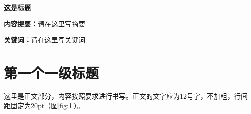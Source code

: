 \documentclass{mystyle} %
\begin{document}
\maketitlepage

\begin{center}
\textbf{\fontsize{18}{22}\selectfont 这是标题}
\end{center}

\begin{flushleft}
\fontsize{10.5}{12}\selectfont \textbf{内容提要：}请在这里写摘要
\end{flushleft}

\begin{flushleft}
\fontsize{10.5}{12}\selectfont \textbf{关键词：}请在这里写关键词
\end{flushleft}

\setcounter{table}{0}
\section{第一个一级标题}
这里是正文部分，内容按照要求进行书写。正文的文字应为12号字，不加粗，行间距固定为20pt（图\ref{fig:1}）。
\end{document}
